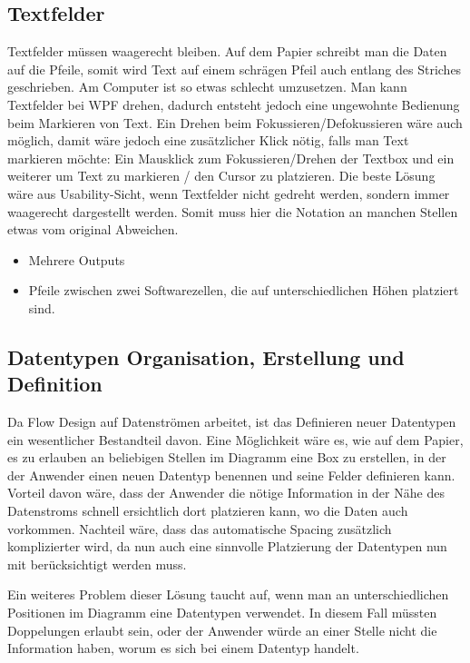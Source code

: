 \subsection{Textfelder}

Textfelder müssen waagerecht bleiben. Auf dem Papier schreibt man die Daten auf
die Pfeile, somit wird Text auf einem schrägen Pfeil auch entlang des Striches
geschrieben.
Am Computer ist so etwas schlecht umzusetzen. Man kann Textfelder bei WPF drehen, dadurch
entsteht jedoch eine ungewohnte Bedienung beim Markieren von Text. Ein Drehen
beim Fokussieren/Defokussieren wäre auch möglich, damit wäre jedoch eine zusätzlicher
Klick nötig, falls man Text markieren möchte: Ein Mausklick zum Fokussieren/Drehen
der Textbox und ein weiterer um Text zu markieren / den Cursor zu platzieren.
Die beste Lösung wäre aus Usability-Sicht, wenn Textfelder nicht gedreht werden,
sondern immer waagerecht dargestellt werden. Somit muss hier die Notation an
manchen Stellen etwas vom original Abweichen.
\begin{itemize}
\item Mehrere Outputs
\item Pfeile zwischen zwei Softwarezellen, die auf unterschiedlichen Höhen platziert
sind.
\end{itemize}

\subsection{Datentypen Organisation, Erstellung und Definition}

Da Flow Design auf Datenströmen arbeitet, ist das Definieren neuer Datentypen
ein wesentlicher Bestandteil davon.
Eine Möglichkeit wäre es, wie auf dem Papier, es zu erlauben an beliebigen
Stellen im Diagramm eine Box zu erstellen, in der der Anwender einen neuen
Datentyp benennen und seine Felder definieren kann. Vorteil davon wäre, dass der
Anwender die nötige Information in der Nähe des Datenstroms schnell ersichtlich
dort platzieren kann, wo die Daten auch vorkommen.
Nachteil wäre, dass das automatische Spacing zusätzlich komplizierter
wird, da nun auch eine sinnvolle Platzierung der Datentypen nun mit
berücksichtigt werden muss.

Ein weiteres Problem dieser Lösung taucht auf, wenn man an unterschiedlichen
Positionen im Diagramm eine Datentypen verwendet. In diesem Fall müssten Doppelungen erlaubt
sein, oder der Anwender würde an einer Stelle nicht die Information haben, worum
es sich bei einem Datentyp handelt.

